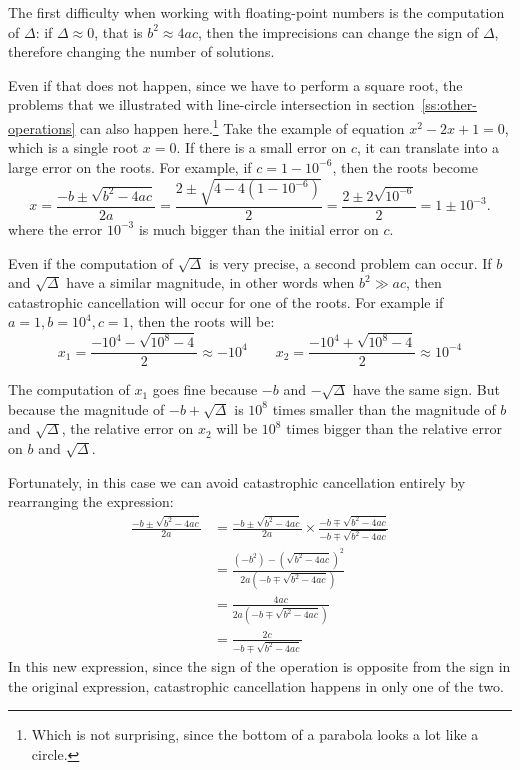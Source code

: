 The first difficulty when working with floating-point numbers is the computation of $\Delta$: if $\Delta \approx 0$, that is $b^2 \approx 4ac$, then the imprecisions can change the sign of $\Delta$, therefore changing the number of solutions.

Even if that does not happen, since we have to perform a square root, the problems that we illustrated with line-circle intersection in section~\ref{ss:other-operations} can also happen here.\footnote{Which is not surprising, since the bottom of a parabola looks a lot like a circle.} Take the example of equation $x^2-2x+1=0$, which is a single root $x=0$. If there is a small error on $c$, it can translate into a large error on the roots. For example, if $c=1-10^{-6}$, then the roots become
\[x = \frac{-b \pm \sqrt{b^2-4ac}}{2a} = \frac{2 \pm \sqrt{4 - 4(1-10^{-6})}}{2} = \frac{2 \pm 2\sqrt{10^{-6}}}{2} = 1 \pm 10^{-3}.\]
where the error $10^{-3}$ is much bigger than the initial error on $c$.


Even if the computation of $\sqrt{\Delta}$ is very precise, a second problem can occur. If $b$ and $\sqrt{\Delta}$ have a similar magnitude, in other words when $b^2 \gg ac$, then catastrophic cancellation will occur for one of the roots. For example if $a=1,b=10^4,c=1$, then the roots will be:
\[x_1 = \frac{-10^4 - \sqrt{10^8-4}}{2} \approx -10^4 \qquad x_2 = \frac{-10^4 + \sqrt{10^8-4}}{2} \approx 10^{-4}\]

The computation of $x_1$ goes fine because $-b$ and $-\sqrt{\Delta}$ have the same sign. But because the magnitude of $-b+\sqrt{\Delta}$ is $10^8$ times smaller than the magnitude of $b$ and $\sqrt{\Delta}$, the relative error on $x_2$ will be $10^8$ times bigger than the relative error on $b$ and $\sqrt{\Delta}$.

Fortunately, in this case we can avoid catastrophic cancellation entirely by rearranging the expression:
\begin{align*}
\frac{-b \pm \sqrt{b^2-4ac}}{2a}
&= \frac{-b \pm \sqrt{b^2-4ac}}{2a} \times \frac{-b \mp \sqrt{b^2-4ac}}{-b \mp \sqrt{b^2-4ac}}\\
&= \frac{(-b^2) - \left(\sqrt{b^2-4ac}\right)^2}{2a \left(-b \mp \sqrt{b^2-4ac}\right)}\\
&= \frac{4ac}{2a \left(-b \mp \sqrt{b^2-4ac}\right)}\\
&= \frac{2c}{-b \mp \sqrt{b^2-4ac}}
\end{align*}
In this new expression, since the sign of the operation is opposite from the sign in the original expression, catastrophic cancellation happens in only one of the two.

